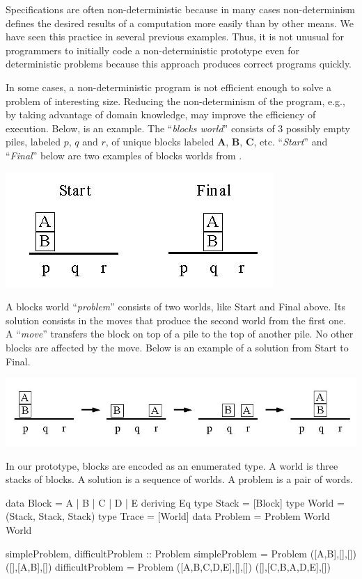 Specifications are often non-deterministic because
in many cases non-determinism defines the desired results of
a computation more easily than by other means.
We have seen this practice in several previous examples.
Thus, it is not unusual for programmers to
initially code a non-deterministic prototype
even for deterministic problems because this approach
produces correct programs quickly.

In some cases, a non-deterministic program is not
efficient enough to solve a problem of interesting size.
Reducing the non-determinism of the program, e.g.,
by taking advantage of domain knowledge, 
may improve the efficiency of execution.
Below, is an example.
The ``\emph{blocks world}'' \cite{wiki:blocks-world}
consists of 3 possibly empty piles,
labeled $p$, $q$ and $r$,
of unique blocks labeled {\bf A}, {\bf B}, {\bf C}, etc.
``\emph{Start}'' and ``\emph{Final}'' below are two examples
of blocks worlds from \cite{Shute20blocks-world}.
%
\begin{center}
\includegraphics[scale=.5]{PICTURES/problem.jpg}
\end{center}
%
A blocks world ``\emph{problem}'' consists of two worlds,
like Start and Final above.
Its solution consists in the moves that produce the second world
from the first one.
A ``\emph{move}'' transfers the block on top of a pile
to the top of another pile. No other blocks are affected by the move.
Below is an example of a solution from Start to Final.
%
\begin{center}
\includegraphics[scale=.5]{PICTURES/solution.jpg}
\end{center}
%
In our prototype,
blocks are encoded as an enumerated type.
A world is three stacks of blocks.
A solution is a sequence of worlds.
A problem is a pair of words.
%
\begin{curry}
data Block = A | B | C | D | E deriving Eq
type Stack = [Block]
type World = (Stack, Stack, Stack)
type Trace = [World]
data Problem = Problem World World

simpleProblem, difficultProblem :: Problem
simpleProblem = Problem ([A,B],[],[]) ([],[A,B],[])
difficultProblem = Problem ([A,B,C,D,E],[],[]) ([],[C,B,A,D,E],[])
\end{curry}
